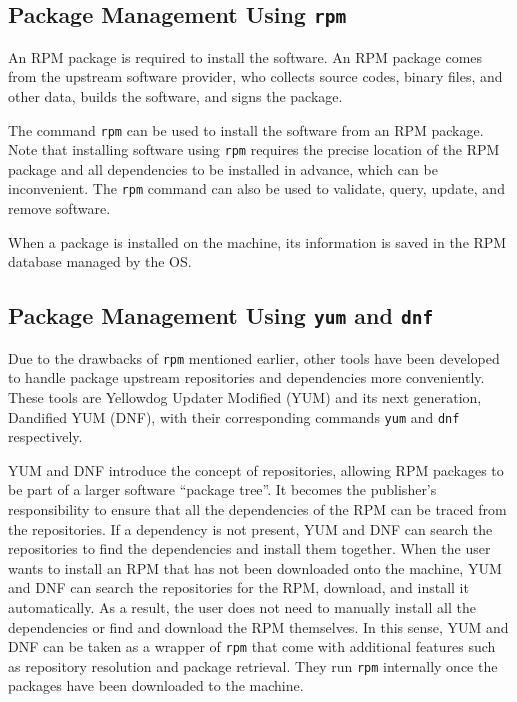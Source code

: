 \subsection{Package Management Using \texttt{rpm}}

An RPM package is required to install the software. An RPM package comes from the upstream software provider, who collects source codes, binary files, and other data, builds the software, and signs the package.

The command \verb|rpm| can be used to install the software from an RPM package. Note that installing software using \verb|rpm| requires the precise location of the RPM package and all dependencies to be installed in advance, which can be inconvenient. The \verb|rpm| command can also be used to validate, query, update, and remove software.

When a package is installed on the machine, its information is saved in the RPM database managed by the OS.

\subsection{Package Management Using \texttt{yum} and \texttt{dnf}}

Due to the drawbacks of \verb|rpm| mentioned earlier, other tools have been developed to handle package upstream repositories and dependencies more conveniently. These tools are Yellowdog Updater Modified (YUM) and its next generation, Dandified YUM (DNF), with their corresponding commands \verb|yum| and \verb|dnf| respectively.

YUM and DNF introduce the concept of repositories, allowing RPM packages to be part of a larger software ``package tree''. It becomes the publisher's responsibility to ensure that all the dependencies of the RPM can be traced from the repositories. If a dependency is not present, YUM and DNF can search the repositories to find the dependencies and install them together. When the user wants to install an RPM that has not been downloaded onto the machine, YUM and DNF can search the repositories for the RPM, download, and install it automatically. As a result, the user does not need to manually install all the dependencies or find and download the RPM themselves. In this sense, YUM and DNF can be taken as a wrapper of \verb|rpm| that come with additional features such as repository resolution and package retrieval. They run \verb|rpm| internally once the packages have been downloaded to the machine.

